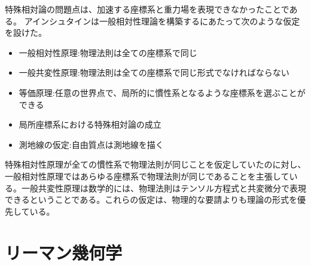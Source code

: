     特殊相対論の問題点は、加速する座標系と重力場を表現できなかったことである。
    アインシュタインは一般相対性理論を構築するにあたって次のような仮定を設けた。
    \begin{itemize}
        \item 一般相対性原理:物理法則は全ての座標系で同じ
        \item 一般共変性原理:物理法則は全ての座標系で同じ形式でなければならない
        \item 等価原理:任意の世界点で、局所的に慣性系となるような座標系を選ぶことができる
        \item 局所座標系における特殊相対論の成立
        \item 測地線の仮定:自由質点は測地線を描く
    \end{itemize}
    特殊相対性原理が全ての慣性系で物理法則が同じことを仮定していたのに対し、一般相対性原理ではあらゆる座標系で物理法則が同じであることを主張している。一般共変性原理は数学的には、物理法則はテンソル方程式と共変微分で表現できるということである。これらの仮定は、物理的な要請よりも理論の形式を優先している。
    \section{リーマン幾何学}
